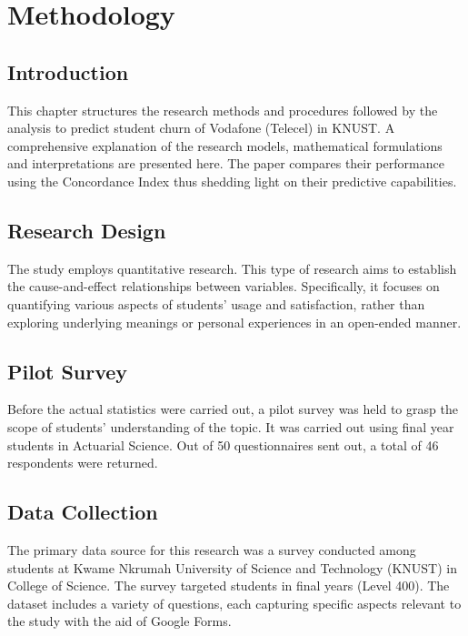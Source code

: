 \documentclass[doublespacing,12pt]{report}
\begin{document}
\newpage
\chapter{Methodology}

\section{Introduction}

This chapter structures the research methods and procedures followed by the analysis to predict student churn of Vodafone (Telecel) in KNUST. A comprehensive explanation of the research models, mathematical formulations and interpretations are presented here. The paper compares their performance using the Concordance Index thus shedding light on their predictive capabilities.

\section{Research Design}

The study employs quantitative research. This type of research aims to establish the cause-and-effect relationships between variables. Specifically, it focuses on quantifying various aspects of students’ usage and satisfaction, rather than exploring underlying meanings or personal experiences in an open-ended manner.

\section{Pilot Survey}

Before the actual statistics were carried out, a pilot survey was held to grasp the scope of students’ understanding of the topic. It was carried out using final year students in Actuarial Science. Out of 50 questionnaires sent out, a total of 46 respondents were returned. 

\section{Data Collection}

The primary data source for this research was a survey conducted among students at Kwame Nkrumah University of Science and Technology (KNUST) in College of Science. The survey targeted students in final years (Level 400). The dataset includes a variety of questions, each capturing specific aspects relevant to the study with the aid of Google Forms.
\end{document}
